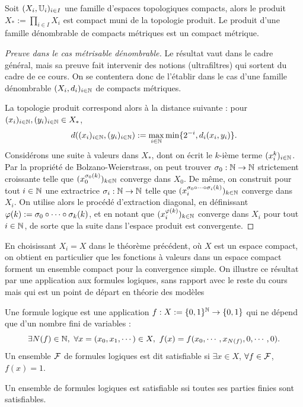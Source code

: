 \begin{theorem}[Tychonov]
\label{th:compProdTycho}
%
Soit $(X_i,\mathbb{U}_i)_{i \in I}$ une famille d'espaces topologiques compacts, alors le produit $X_* := \prod_{i \in I} X_i$ est compact muni de la topologie produit.
Le produit d'une famille dénombrable de compacts métriques est un compact métrique.
\end{theorem}

\begin{proof}[Preuve dans le cas métrisable dénombrable]
	Le résultat vaut dans le cadre général, mais sa preuve fait intervenir des notions (ultrafiltres) qui sortent du cadre de ce cours. On se contentera donc de l'établir dans le cas d'une famille dénombrable $(X_i,d_i)_{i \in \mathbb{N}}$ de compacts métriques.
	
	La topologie produit correspond alors à la distance suivante : pour $(x_i)_{i \in \mathbb{N}}, (y_i)_{i \in \mathbb{N}} \in X_*$,
	\begin{equation*}
		d( (x_i)_{i \in \mathbb{N}}, (y_i)_{i \in \mathbb{N}}) := \max_{i \in \mathbb{N}} \min\{2^{-i}, d_i(x_i,y_i)\}.
	\end{equation*}
	Considérons une suite à valeurs dans $X_*$, dont on écrit le $k$-ième terme $(x_i^k)_{i \in \mathbb{N}}$. Par la propriété de Bolzano-Weierstrass, on peut trouver $\sigma_0 : \mathbb{N} \to \mathbb{N}$ strictement croissante telle que $(x_0^{\sigma_0(k)})_{k \in \mathbb{N}}$ converge dans $X_0$. 
	De même, on construit pour tout $i \in \mathbb{N}$ une extractrice $\sigma_i : \mathbb{N} \to \mathbb{N}$ telle que 
	$(x_i^{\sigma_0\circ \cdots \circ \sigma_i(k)})_{k \in \mathbb{N}}$ converge dans $X_i$.
	On utilise alors le procédé d'extraction diagonal, en définissant 
	$\varphi(k) := \sigma_0 \circ \cdots \circ \sigma_k(k)$, et en notant que $(x_i^{\varphi(k)})_{k \in \mathbb{N}}$ converge dans $X_i$ pour tout $i \in \mathbb{N}$, de sorte que la suite dans l'espace produit est convergente. 
\end{proof}

En choisissant $X_i = X$ dans le théorème précédent, où $X$ est un espace compact, on obtient en particulier que les fonctions à valeurs dans un espace compact forment un ensemble compact pour la convergence simple.
On illustre ce résultat par une application aux formules logiques, sans rapport avec le reste du cours mais qui est un point de départ en théorie des modèles
\begin{exemple}
\label{ex:formuleLogique}
%
Une formule logique est une application $f : X := \{0,1\}^{\mathbb{N}} \to \{0,1\}$ qui ne dépend que d'un nombre fini de variables : 
$$
\exists N(f) \in \mathbb{N},\ \forall x=(x_0,x_1,\cdots)\in X,\
f(x) = f(x_0,\cdots,x_{N(f)},0,\cdots,0).
$$
Un ensemble $\mathcal{F}$ de formules logiques est dit satisfiable si $\exists x \in X$, $\forall f \in \mathcal{F}$, $f(x)=1$. 

Un ensemble de formules logiques est satisfiable ssi toutes ses parties finies sont satisfiables. 
\end{exemple}
	
